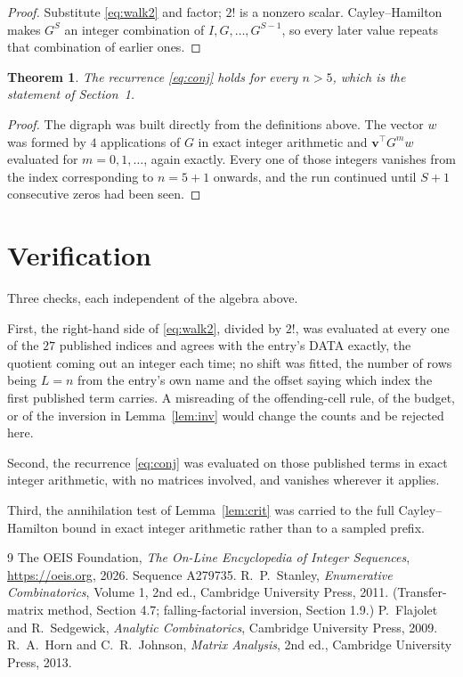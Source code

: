 \documentclass[11pt,a4paper]{article}
\theoremstyle{plain}
\newtheorem{theorem}{Theorem}
\theoremstyle{definition}
\begin{document}
\begin{proof}
Substitute \eqref{eq:walk2} and factor; $2!$ is a nonzero scalar. Cayley--Hamilton
makes $G^{S}$ an integer combination of $I,G,\dots,G^{S-1}$, so every later value repeats
that combination of earlier ones.
\end{proof}

\begin{theorem}
The recurrence \eqref{eq:conj} holds for every $n>5$, which is the statement of
Section~1.
\end{theorem}

\begin{proof}
The digraph was built directly from the definitions above. The vector $w$ was formed by
$4$ applications of $G$ in exact integer arithmetic and $\mathbf{v}^{\!\top}G^{m}w$
evaluated for $m=0,1,\dots$, again exactly. Every one of those integers vanishes from the
index corresponding to $n=5+1$ onwards, and the run continued until $S+1$ consecutive
zeros had been seen.
\end{proof}

\section{Verification}

Three checks, each independent of the algebra above.

First, the right-hand side of \eqref{eq:walk2}, divided by $2!$, was evaluated at every
one of the $27$ published indices and agrees with the entry's DATA exactly, the quotient
coming out an integer each time; no shift was fitted, the number of rows being
$L=n$ from the entry's own name and the offset saying which index the first published
term carries. A misreading of the offending-cell rule, of the budget, or of the inversion in
Lemma~\ref{lem:inv} would change the counts and be rejected here.

Second, the recurrence \eqref{eq:conj} was evaluated on those published terms in exact
integer arithmetic, with no matrices involved, and vanishes wherever it applies.

Third, the annihilation test of Lemma~\ref{lem:crit} was carried to the full
Cayley--Hamilton bound in exact integer arithmetic rather than to a sampled prefix.

\begin{thebibliography}{9}
 The OEIS Foundation, \emph{The On-Line Encyclopedia of Integer
Sequences}, \url{https://oeis.org}, 2026. Sequence A279735.
 R.~P.~Stanley, \emph{Enumerative Combinatorics}, Volume 1, 2nd ed.,
Cambridge University Press, 2011. (Transfer-matrix method, Section 4.7; falling-factorial
inversion, Section 1.9.)
 P.~Flajolet and R.~Sedgewick, \emph{Analytic Combinatorics}, Cambridge
University Press, 2009.
 R.~A.~Horn and C.~R.~Johnson, \emph{Matrix Analysis}, 2nd ed., Cambridge
University Press, 2013.
\end{thebibliography}
\end{document}
